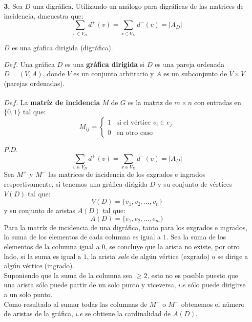 \documentclass[12pt]{article}
\begin{document}
%
%
\textbf{3.} Sea $D$ una digráfica. Utilizando un análogo para digráficas de las matrices de incidencia, dmeuestra que:\\
\[
\sum_{\displaystyle v \in V_D} d^{+}(v) = \sum_{\displaystyle v \in V_D} d^{-}(v) = |A_D|
\]
\begin{tcolorbox}[title=\textbf{Hipotesis}, colback=red!15!white, colframe=black!]
    $D$ es una gŕafica dirigida (digráfica).
\end{tcolorbox}
\begin{tcolorbox}[title=\textbf{Definiciones}, colback=blue!15!white, colframe=black!]
    $Def$. Una gráfica $D$ es una \textbf{gráfica dirigida} si $D$ es una pareja ordenada $D=(V,A)$, donde
    $V$ es un conjunto arbitrario y $A$ es un subconjunto de $V \times V$ (parejas ordenadas).
    \\
    \\
    $Def$. La \textbf{matríz de incidencia} $M$ de $G$ es la matriz de $m \times n$ con entradas en $\{0, 1\}$ tal que:
    \[M_{ij} = \begin{cases} 1 & \text{si el vértice } v_i \in e_j\\ 0 & \text{en otro caso} \end{cases}\]

\end{tcolorbox}

$P.D.$
\[\sum_{\displaystyle v \in V_D} d^{+}(v) = \sum_{\displaystyle v \in V_D} d^{-}(v) = |A_D|\]
Sea $M^+$ y $M^-$ las matrices de incidencia de los exgrados e ingrados respectivamente, si tenemos una gráfica dirigida $D$ y su conjunto
de vértices $V(D)$ tal que:
\[V(D) = \{v_1, v_2, ..., v_n\}\]
y su conjunto de aristas $A(D)$ tal que:
\[A(D) = \{e_1, e_2, ..., e_m\}\]
Para la matríz de incidencia de una digráfica, tanto para los exgrados e ingrados, la suma
de los elementos de cada columna es igual a $1$. Sea la suma de los elementos de la columna igual a $0$,
se concluye que la arista no existe, por otro lado, si la suma es igual a $1$, la arista \textit{sale} de algún vértice (exgrado)
o se dirige a algún vértice (ingrado).\\

Suponiendo que la suma de la columna sea $\geq 2$, esto no es posible puesto que una arista sólo puede partir de un solo punto y viceversa, $i.e$ sólo 
puede dirigirse a un solo punto.\\

Como resultado al sumar todas las columnas de $M^+$ o $M^-$ obtenemos el número de aristas de la gráfica, $i.e$ se obtiene la 
cardinalidad de $A(D)$.
\end{document}
